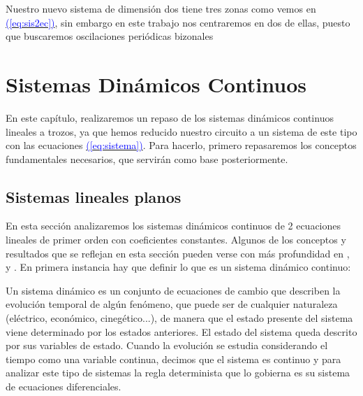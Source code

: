 \documentclass[12pt,a4paper]{report} %
\newcommand{\eref}[1]{\hyperref[#1]{\textcolor{blue}{(\ref*{#1})}}}
\begin{document}

	
	\vspace{0.5cm}Nuestro nuevo sistema de dimensión dos tiene tres zonas como vemos en \eref{eq:sis2ec}, sin embargo en este trabajo nos centraremos en dos de ellas, puesto que buscaremos oscilaciones periódicas bizonales

	
	\chapter{Sistemas Dinámicos Continuos}
	\label{cap.2}
	
	En este capítulo, realizaremos un repaso de los sistemas dinámicos continuos lineales a trozos, ya que hemos reducido nuestro circuito a un sistema de este tipo con las ecuaciones \eref{eq:sistema}. Para hacerlo, primero repasaremos los conceptos fundamentales necesarios, que servirán como base posteriormente.
	
	\section{Sistemas lineales planos}
	\label{sec:sislinplanos}
	
	En esta sección analizaremos los sistemas dinámicos continuos de 2 ecuaciones lineales de primer orden con coeficientes constantes. Algunos de los conceptos y resultados que se reflejan en esta sección pueden verse con más profundidad en \cite{hirsch}, \cite{simmons} y \cite{zill}.
	En primera instancia hay que definir lo que es un sistema dinámico continuo:
	
	\vspace{0.5cm}Un sistema dinámico es un conjunto de ecuaciones de cambio que describen la evolución temporal de algún fenómeno, que puede ser de cualquier naturaleza (eléctrico, económico, cinegético...), de manera que el estado presente del sistema viene determinado por los estados anteriores. El estado del sistema queda descrito por sus variables de estado. Cuando la evolución se estudia considerando el tiempo como una variable  continua, decimos que el sistema es continuo y para analizar este tipo de sistemas la regla determinista que lo gobierna es su sistema de ecuaciones diferenciales.
	
\end{document}
